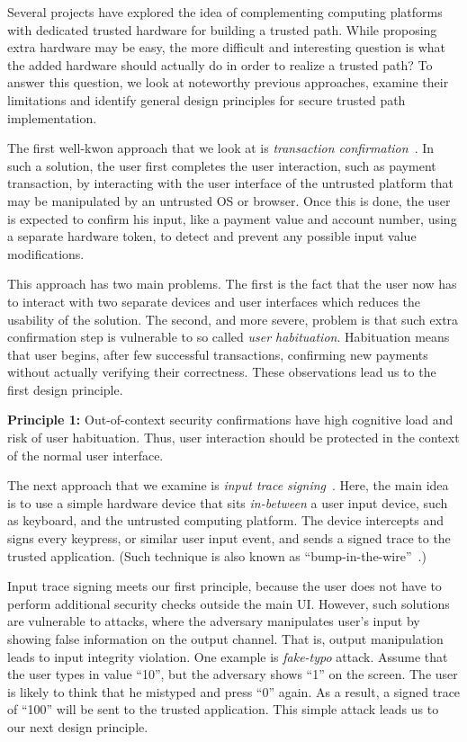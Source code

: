 Several projects have explored the idea of complementing computing platforms with dedicated trusted hardware for building a trusted path. While proposing extra hardware may be easy, the more difficult and interesting question is what the added hardware should actually do in order to realize a trusted path? To answer this question, we look at noteworthy previous approaches, examine their limitations and identify general design principles for secure trusted path implementation.
	
The first well-kwon approach that we look at is \emph{transaction confirmation}~\cite{filyanov2011uni}. In such a solution, the user first completes the user interaction, such as payment transaction, by interacting with the user interface of the untrusted platform that may be manipulated by an untrusted OS or browser. Once this is done, the user is expected to confirm his input, like a payment value and account number, using a separate hardware token, to detect and prevent any possible input value modifications.

This approach has two main problems. The first is the fact that the user now has to interact with two separate devices and user interfaces which reduces the usability of the solution. The second, and more severe, problem is that such extra confirmation step is vulnerable to so called \emph{user habituation}. Habituation means that user begins, after few successful transactions, confirming new payments without actually verifying their correctness. These observations lead us to the first design principle.  

\begin{tcolorbox}
\textbf{Principle 1:} Out-of-context security confirmations have high cognitive load and risk of user habituation. Thus, user interaction should be protected in the context of the normal user interface.
\end{tcolorbox}

The next approach that we examine is \emph{input trace signing}~\cite{IntegriKey}. Here, the main idea is to use a simple hardware device that sits \emph{in-between} a user input device, such as keyboard, and the untrusted computing platform. The device intercepts and signs every keypress, or similar user input event, and sends a signed trace to the trusted application. (Such technique is also known as ``bump-in-the-wire''~\cite{McCPerRei2006}.) 

Input trace signing meets our first principle, because the user does not have to perform additional security checks outside the main UI. However, such solutions are vulnerable to attacks, where the adversary manipulates user's input by showing false information on the output channel. That is, output manipulation leads to input integrity violation. One example is \emph{fake-typo} attack. Assume that the user types in value ``10'', but the adversary shows ``1'' on the screen. The user is likely to think that he mistyped and press ``0'' again. As a result, a signed trace of ``100'' will be sent to the trusted application. This simple attack leads us to our next design principle.

